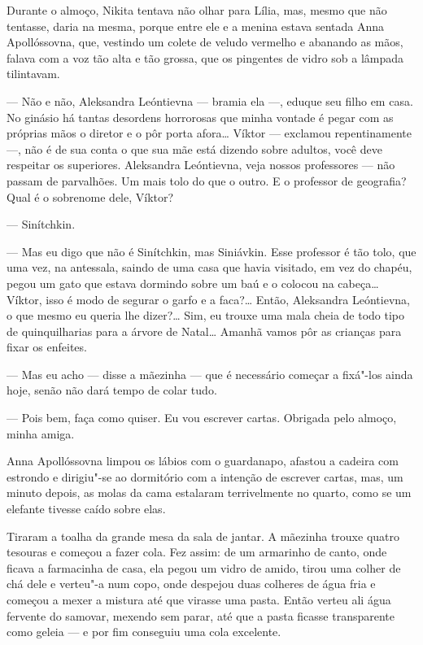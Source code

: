 Durante o almoço, Nikita tentava não olhar para Lília, mas, mesmo que
não tentasse, daria na mesma, porque entre ele e a menina estava sentada
Anna Apollóssovna, que, vestindo um colete de veludo vermelho e abanando
as mãos, falava com a voz tão alta e tão grossa, que os pingentes de
vidro sob a lâmpada tilintavam.

--- Não e não, Aleksandra Leóntievna --- bramia ela ---, eduque seu
filho em casa. No ginásio há tantas desordens horrorosas que minha
vontade é pegar com as próprias mãos o diretor e o pôr porta afora\ldots{}
Víktor --- exclamou repentinamente ---, não é de sua conta o que sua mãe
está dizendo sobre adultos, você deve respeitar os superiores.
Aleksandra Leóntievna, veja nossos professores --- não passam de
parvalhões. Um mais tolo do que o outro. E o professor de geografia?
Qual é o sobrenome dele, Víktor?

--- Sinítchkin.

--- Mas eu digo que não é Sinítchkin, mas Siniávkin. Esse professor é
tão tolo, que uma vez, na antessala, saindo de uma casa que havia
visitado, em vez do chapéu, pegou um gato que estava dormindo sobre um
baú e o colocou na cabeça\ldots{} Víktor, isso é modo de segurar o garfo e a
faca?\ldots{} Então, Aleksandra Leóntievna, o que mesmo eu queria lhe
dizer?\ldots{} Sim, eu trouxe uma mala cheia de todo tipo de quinquilharias
para a árvore de Natal\ldots{} Amanhã vamos pôr as crianças para fixar os
enfeites.

--- Mas eu acho --- disse a mãezinha --- que é necessário começar a
fixá"-los ainda hoje, senão não dará tempo de colar tudo.

--- Pois bem, faça como quiser. Eu vou escrever cartas. Obrigada pelo
almoço, minha amiga.

Anna Apollóssovna limpou os lábios com o guardanapo, afastou a cadeira
com estrondo e dirigiu"-se ao dormitório com a intenção de escrever
cartas, mas, um minuto depois, as molas da cama estalaram terrivelmente
no quarto, como se um elefante tivesse caído sobre elas.

Tiraram a toalha da grande mesa da sala de jantar. A mãezinha trouxe
quatro tesouras e começou a fazer cola. Fez assim: de um armarinho de
canto, onde ficava a farmacinha de casa, ela pegou um vidro de amido,
tirou uma colher de chá dele e verteu"-a num copo, onde despejou duas
colheres de água fria e começou a mexer a mistura até que virasse uma
pasta. Então verteu ali água fervente do samovar, mexendo sem parar, até que a pasta ficasse transparente como geleia --- e
por fim conseguiu uma cola excelente.

